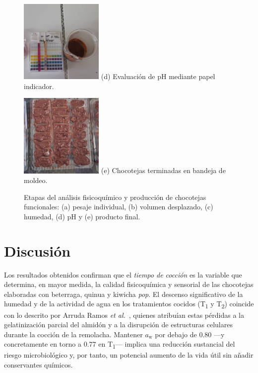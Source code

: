 \documentclass[manuscript,screen,review]{acmart}
\begin{document}
\begin{figure}[H]
\begin{minipage}{0.26\linewidth}
    \includegraphics[width=4cm,height=4cm,keepaspectratio]{imagen/resultados/pH-re.jpeg}
    \small (d) Evaluación de pH mediante papel indicador.
  \end{minipage}\hfill
  \begin{minipage}{0.26\linewidth}
    \centering
    \includegraphics[width=4cm,height=4cm,keepaspectratio]{imagen/resultados/Choco-re.jpeg}
    \small (e) Chocotejas terminadas en bandeja de moldeo.
  \end{minipage}
  \caption{Etapas del análisis fisicoquímico y producción de chocotejas funcionales: (a) pesaje individual, (b) volumen desplazado, (c) humedad, (d) pH y (e) producto final.}
  \label{fig:proceso_analisis}
\end{figure}






\section{Discusión}

Los resultados obtenidos confirman que el \emph{tiempo de cocción} es la variable que determina, en mayor medida, la calidad fisicoquímica y sensorial de las chocotejas elaboradas con beterraga, quinua y kiwicha \textit{pop}. El descenso significativo de la humedad y de la actividad de agua en los tratamientos cocidos (T\textsubscript{1} y T\textsubscript{2}) coincide con lo descrito por Arruda Ramos \textit{et al.}~\cite{ArrudaRamos2017}, quienes atribuían estas pérdidas a la gelatinización parcial del almidón y a la disrupción de estructuras celulares durante la cocción de la remolacha. Mantener $a_\mathrm{w}$ por debajo de 0.80 —y concretamente en torno a 0.77 en T\textsubscript{1}— implica una reducción sustancial del riesgo microbiológico y, por tanto, un potencial aumento de la vida útil sin añadir conservantes químicos.
\end{document}

